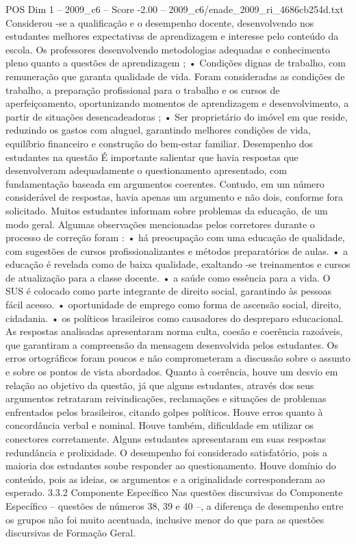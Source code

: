\begin{textsample}{POS Dim 1 – 2009\_c6 – Score -2.00 – 2009\_c6/enade\_2009\_ri\_4686cb254d.txt}
Considerou -se a qualificação e o desempenho docente, desenvolvendo nos estudantes melhores expectativas de aprendizagem e interesse pelo conteúdo da escola.
Os professores desenvolvendo metodologias adequadas e conhecimento pleno quanto a questões de aprendizagem ; • Condições dignas de trabalho, com remuneração que garanta qualidade de vida.
Foram consideradas as condições de trabalho, a preparação profissional para o trabalho e os cursos de aperfeiçoamento, oportunizando momentos de aprendizagem e desenvolvimento, a partir de situações desencadeadoras ; • Ser proprietário do imóvel em que reside, reduzindo os gastos com aluguel, garantindo melhores condições de vida, equilíbrio financeiro e construção do bem-estar familiar.
Desempenho dos estudantes na questão É importante salientar que havia respostas que desenvolveram adequadamente o questionamento apresentado, com fundamentação baseada em argumentos coerentes.
Contudo, em um número considerável de respostas, havia apenas um argumento e não dois, conforme fora solicitado.
Muitos estudantes informam sobre problemas da educação, de um modo geral.
Algumas observações mencionadas pelos corretores durante o processo de correção foram : • há preocupação com uma educação de qualidade, com sugestões de cursos profissionalizantes e métodos preparatórios de aulas. • a educação é revelada como de baixa qualidade, exaltando -se treinamentos e cursos de atualização para a classe docente. • a saúde como essência para a vida.
O SUS é colocado como parte integrante de direito social, garantindo às pessoas fácil acesso. • oportunidade de emprego como forma de ascensão social, direito, cidadania. • os políticos brasileiros como causadores do despreparo educacional.
As respostas analisadas apresentaram norma culta, coesão e coerência razoáveis, que garantiram a compreensão da mensagem desenvolvida pelos estudantes.
Os erros ortográficos foram poucos e não comprometeram a discussão sobre o assunto e sobre os pontos de vista abordados.
Quanto à coerência, houve um desvio em relação ao objetivo da questão, já que alguns estudantes, através dos seus argumentos retrataram reivindicações, reclamações e situações de problemas enfrentados pelos brasileiros, citando golpes políticos.
Houve erros quanto à concordância verbal e nominal.
Houve também, dificuldade em utilizar os conectores corretamente.
Alguns estudantes apresentaram em suas respostas redundância e prolixidade.
O desempenho foi considerado satisfatório, pois a maioria dos estudantes soube responder ao questionamento.
Houve domínio do conteúdo, pois as ideias, os argumentos e a originalidade corresponderam ao esperado. 3.3.2 Componente Específico Nas questões discursivas do Componente Específico – questões de números 38, 39 e 40 –, a diferença de desempenho entre os grupos não foi muito acentuada, inclusive menor do que para as questões discursivas de Formação Geral.

\end{textsample}
